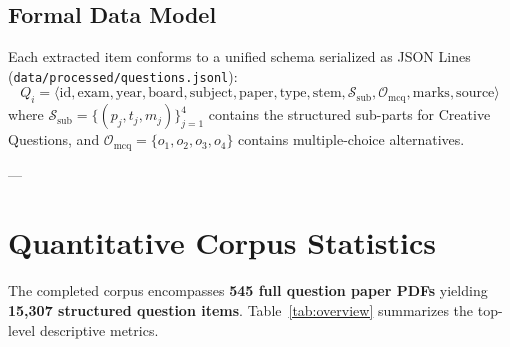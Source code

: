 \documentclass[11pt,a4paper]{article}
\begin{document}
\subsection{Formal Data Model}
Each extracted item conforms to a unified schema serialized as JSON Lines (\nolinkurl{data/processed/questions.jsonl}):
\begin{equation}
    Q_i = \langle \text{id}, \text{exam}, \text{year}, \text{board}, \text{subject}, \text{paper}, \text{type}, \text{stem}, \mathcal{S}_{\text{sub}}, \mathcal{O}_{\text{mcq}}, \text{marks}, \text{source} \rangle
\end{equation}
where $\mathcal{S}_{\text{sub}} = \{ (p_j, t_j, m_j) \}_{j=1}^4$ contains the structured sub-parts for Creative Questions, and $\mathcal{O}_{\text{mcq}} = \{ o_1, o_2, o_3, o_4 \}$ contains multiple-choice alternatives.

---

\section{Quantitative Corpus Statistics}
\label{sec:stats}

The completed corpus encompasses \textbf{545 full question paper PDFs} yielding \textbf{15,307 structured question items}. Table~\ref{tab:overview} summarizes the top-level descriptive metrics.
\end{document}
